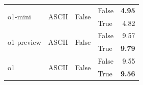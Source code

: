 \begin{tabular}{@{}llllr@{}}
    \midrule                                
    \multirow[c]{2}{*}{o1-mini}                                         & \multirow[c]{2}{*}{ASCII} & \multirow[c]{2}{*}{False} & False                     & \textbf{4.95} \\
                                                                        &                           &                           & True                      & 4.82 \\
    \midrule                                    
    \multirow[c]{2}{*}{o1-preview}                                      & \multirow[c]{2}{*}{ASCII} & \multirow[c]{2}{*}{False} & False                     & 9.57 \\
                                                                        &                           &                           & True                      & \textbf{9.79} \\
    \midrule                                    
    \multirow[c]{2}{*}{o1}                                              & \multirow[c]{2}{*}{ASCII} & \multirow[c]{2}{*}{False} & False                     & 9.55 \\
                                                                        &                           &                           & True                      & \textbf{9.56} \\
    \bottomrule
\end{tabular}
